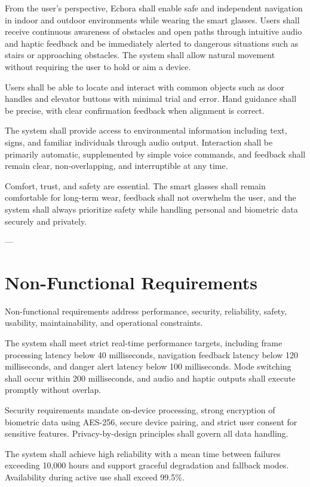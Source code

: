 From the user’s perspective, Echora shall enable safe and independent navigation in indoor and outdoor environments while wearing the smart glasses. Users shall receive continuous awareness of obstacles and open paths through intuitive audio and haptic feedback and be immediately alerted to dangerous situations such as stairs or approaching obstacles. The system shall allow natural movement without requiring the user to hold or aim a device.

Users shall be able to locate and interact with common objects such as door handles and elevator buttons with minimal trial and error. Hand guidance shall be precise, with clear confirmation feedback when alignment is correct.

The system shall provide access to environmental information including text, signs, and familiar individuals through audio output. Interaction shall be primarily automatic, supplemented by simple voice commands, and feedback shall remain clear, non-overlapping, and interruptible at any time.

Comfort, trust, and safety are essential. The smart glasses shall remain comfortable for long-term wear, feedback shall not overwhelm the user, and the system shall always prioritize safety while handling personal and biometric data securely and privately.

---

\section{Non-Functional Requirements}

Non-functional requirements address performance, security, reliability, safety, usability, maintainability, and operational constraints.

The system shall meet strict real-time performance targets, including frame processing latency below 40 milliseconds, navigation feedback latency below 120 milliseconds, and danger alert latency below 100 milliseconds. Mode switching shall occur within 200 milliseconds, and audio and haptic outputs shall execute promptly without overlap.

Security requirements mandate on-device processing, strong encryption of biometric data using AES-256, secure device pairing, and strict user consent for sensitive features. Privacy-by-design principles shall govern all data handling.

The system shall achieve high reliability with a mean time between failures exceeding 10,000 hours and support graceful degradation and fallback modes. Availability during active use shall exceed 99.5\%.

